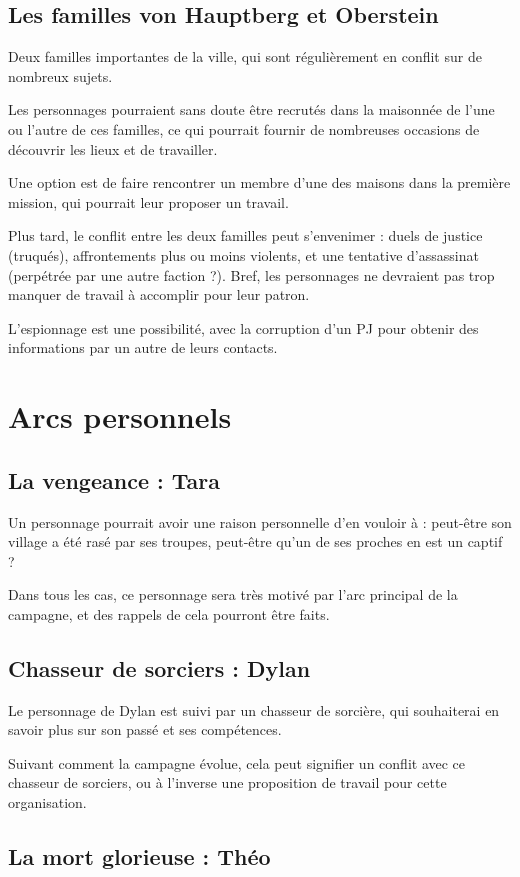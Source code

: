 \documentclass[10pt,a4paper]{book}
\begin{document}
\subsection{Les familles von Hauptberg et Oberstein}

Deux familles importantes de la ville, qui sont régulièrement en conflit sur de nombreux sujets.

Les personnages pourraient sans doute être recrutés dans la maisonnée de l'une ou l'autre de ces familles, ce qui pourrait fournir de nombreuses occasions de découvrir les lieux et de travailler.

Une option est de faire rencontrer un membre d'une des maisons dans la première mission, qui pourrait leur proposer un travail.

Plus tard, le conflit entre les deux familles peut s'envenimer : duels de justice (truqués), affrontements plus ou moins violents, et une tentative d'assassinat (perpétrée par une autre faction ?). Bref, les personnages ne devraient pas trop manquer de travail à accomplir pour leur patron.

L'espionnage est une possibilité, avec la corruption d'un PJ pour obtenir des informations par un autre de leurs contacts.
\section{Arcs personnels}
\subsection{La vengeance : Tara}
Un personnage pourrait avoir une raison personnelle d'en vouloir à \nomadversaire : peut-être son village a été rasé par ses troupes, peut-être qu'un de ses proches en est un captif ?

Dans tous les cas, ce personnage sera très motivé par l'arc principal de la campagne, et des rappels de cela pourront être faits.
\subsection{Chasseur de sorciers : Dylan}
Le personnage de Dylan est suivi par un chasseur de sorcière, qui souhaiterai en savoir plus sur son passé et ses compétences.

Suivant comment la campagne évolue, cela peut signifier un conflit avec ce chasseur de sorciers, ou à l'inverse une proposition de travail pour cette organisation.
\subsection{La mort glorieuse : Théo}
\end{document}
